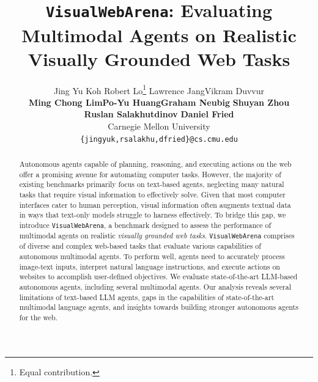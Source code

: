 \documentclass[11pt]{article}
\title{\texttt{VisualWebArena}: Evaluating Multimodal Agents on Realistic Visually Grounded Web Tasks}
\author{%
Jing Yu Koh \quad 
Robert Lo\thanks{Equal contribution.} \quad
Lawrence Jang\footnotemark[1]  \quad Vikram Duvvur\footnotemark[1] \\
\textbf{Ming Chong Lim}\footnotemark[1]  \quad \textbf{Po-Yu Huang}\footnotemark[1]  \quad \textbf{Graham Neubig} \quad \textbf{Shuyan Zhou}  \\ 
\textbf{Ruslan Salakhutdinov} \quad \textbf{Daniel Fried}\\ 
{Carnegie Mellon University} \\
  \texttt{\{jingyuk,rsalakhu,dfried\}@cs.cmu.edu} \\
}
\def\BenchmarkName{\texttt{VisualWebArena}\xspace}
\begin{document}
\maketitle
\begin{abstract}
Autonomous agents capable of planning, reasoning, and executing actions on the web offer a promising avenue for automating computer tasks. However, the majority of existing benchmarks primarily focus on text-based agents, neglecting many natural tasks that require visual information to effectively solve. Given that most computer interfaces cater to human perception, visual information often augments textual data in ways that text-only models struggle to harness effectively.
To bridge this gap, we introduce \BenchmarkName{}, a benchmark designed to assess the performance of multimodal agents on realistic \textit{visually grounded web tasks}. \BenchmarkName{} comprises of diverse and complex web-based tasks that evaluate various capabilities of autonomous multimodal agents. 
To perform well, agents need to accurately process image-text inputs, interpret natural language instructions, and execute actions on websites to accomplish user-defined objectives.
We evaluate state-of-the-art LLM-based autonomous agents, including several multimodal agents. Our analysis reveals several limitations of text-based LLM agents, gaps in the capabilities of state-of-the-art multimodal language agents, and insights towards building stronger autonomous agents for the web. 
\end{abstract}
















\pagebreak
\appendix

\end{document}
